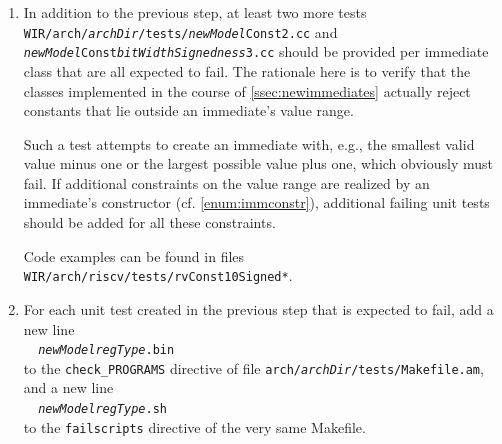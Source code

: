 \begin{enumerate}[resume]
  Such a test first creates some immediates of a given bit width and signedness using constants that lie in the immediate's value range.
  Assertions are again applied next to validate these immediates' types, values, bit widths, signedness etc.
  In analogy to \cref{enum:vregTest}, these immediate parameters are next duplicated using their copy/move constructors and operators, and the duplicates' properties are again checked using assertions.
  Finally, the smallest and largest possible values of the valid value range are used to construct some more immediate parameters.
  This ensures that the entire value range is correctly covered and supported by some implemented immediate class.

  A typical example for this kind of tests is \texttt{WIR/arch/riscv/tests/rvConst12Signed1.cc}.
  Obviously, these tests are expected to pass so that they need to be integrated into the build infrastructure according to \cref{enum:passUnitTest}.

  \item In addition to the previous step, at least two more tests \texttt{WIR/arch/{\itshape archDir}/tests/{\itshape newModel}Const2.cc} and \texttt{{\itshape newModel}Const{\itshape bitWidthSignedness}3.cc} should be provided per immediate class that are all expected to fail.
  The rationale here is to verify that the classes implemented in the course of \cref{ssec:newimmediates} actually reject constants that lie outside an immediate's value range.

  Such a test attempts to create an immediate with, e.g., the smallest valid value minus one or the largest possible value plus one, which obviously must fail.
  If additional constraints on the value range are realized by an immediate's constructor (cf. \cref{enum:immconstr}), additional failing unit tests should be added for all these constraints.

  Code examples can be found in files \texttt{WIR/arch/riscv/tests/rvConst10Signed*}.

  \item For each unit test created in the previous step that is expected to fail, add a new line\label{enum:failUnitTest} \\
  \verb|  |\texttt{{\itshape newModelregType}.bin} \\
  to the \texttt{check\_PROGRAMS} directive of file \texttt{arch/{\itshape archDir}/tests/Makefile.am}, and a new line \\
  \verb|  |\texttt{{\itshape newModelregType}.sh} \\
  to the \texttt{failscripts} directive of the very same Makefile.


\end{enumerate}
